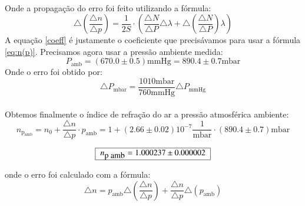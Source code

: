 \documentclass[a4paper,11pt]{article}
\begin{document}
\paragraph{}Onde a propagação do erro foi feito utilizando a fórmula:
\begin{displaymath}
	\triangle \left( \frac{\triangle n }{\triangle p} \right) = \frac{1}{2S} \cdot \left(\frac{\triangle N}{\triangle P} \triangle \lambda + \triangle \left(\frac{\triangle N}{\triangle P}\right) \lambda\right)
\end{displaymath}
A equação \ref{coeff} é justamente o coeficiente que precisávamos para usar a fórmula \ref{eq:n(p)}. Precisamos agora usar a pressão ambiente medida:
\begin{displaymath}
    P_{\mbox{amb}} = (670.0 \pm 0.5)\mbox{mmHg} = 890.4 \pm 0.7 \mbox{mbar}
\end{displaymath}
Onde o erro foi obtido por:
\begin{displaymath}
	\triangle P_{\mbox{mbar}} = \frac{1010\mbox{mbar}}{760 \mbox{mmHg}} \triangle P_{\mbox{mmHg}}
\end{displaymath}
\paragraph{}Obtemos finalmente o índice de refração do ar a pressão atmosférica ambiente:
\begin{displaymath}
    n_{\mbox{p$_{\mbox{amb}}$}} = n_0 + \frac{\triangle n}{\triangle p} \cdot p_{\mbox{amb}} = 1 + (2.66 \pm 0.02)10^{-7}\frac{1}{\mbox{mbar}} \cdot (890.4 \pm 0.7)\mbox{mbar}
\end{displaymath}

\begin{equation}
	\begin{tabular}{|c|}\hline
	$n_{\mbox{p amb}} = 1.000237 \pm 0.000002 $\\ \hline	
	\end{tabular}
\end{equation}

onde o erro foi calculado com a fórmula:
\begin{displaymath}
      \triangle n = p_{\mbox{amb}} \triangle \left( \frac{\triangle n}{\triangle p} \right) + \frac{\triangle n}{\triangle p} \triangle  \left( p_{\mbox{amb}} \right)
\end{displaymath}
\end{document}
